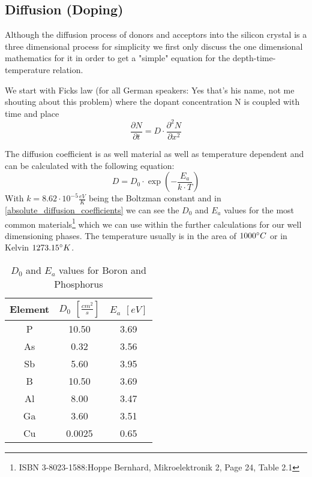 \subsection{Diffusion (Doping)}

Although the diffusion process of donors and acceptors into the silicon crystal is a three dimensional process for simplicity we first only discuss the one dimensional mathematics for it in order to get a "simple" equation for the depth-time-temperature relation.

We start with Ficks law (for all German speakers: Yes that's his name, not me shouting about this problem) where the dopant concentration N is coupled with time and place
\begin{equation}
\frac{\partial N}{\partial t} = D \cdot \frac{\partial^2 N}{\partial x^2}
\end{equation}

The diffusion coefficient is as well material as well as temperature dependent  and can be calculated with the following equation:
\begin{equation}
D = D_0 \cdot \exp\left(-\frac{E_a}{k \cdot T}\right)
\end{equation}
With $k=8.62 \cdot 10^{-5} \frac{eV}{K}$ being the Boltzman constant and in \autoref{absolute_diffusion_coefficients} we can see the $D_0$ and $E_a$ values for the most common materials\footnote{ISBN 3-8023-1588:Hoppe Bernhard, Mikroelektronik 2, Page 24, Table 2.1} which we can use within the further calculations for our well dimensioning phases. The temperature usually is in the area of $1000\degree C$ or in Kelvin $1273.15\degree K$.
\begin{table}[H]
	\centering
	\begin{tabular}{|c|c|c|}
		\hline
		Element &
		$D_0$ $\left[\frac{cm^2}{s}\right]$ &
		$E_a$ $\left[eV\right]$ \\
		\hline
		P &
		10.50 &
		3.69 \\
		\hline
		As &
		0.32 &
		3.56 \\
		\hline
		Sb &
		5.60 &
		3.95 \\
		\hline
		B &
		10.50 &
		3.69 \\
		\hline
		Al &
		8.00 &
		3.47 \\
		\hline
		Ga &
		3.60 &
		3.51 \\
		\hline
		Cu &
		0.0025 &
		0.65 \\
		\hline
	\end{tabular}
	\label{absolute_diffusion_coefficients}
	\caption{$D_0$ and $E_a$ values for Boron and Phosphorus}
\end{table}


